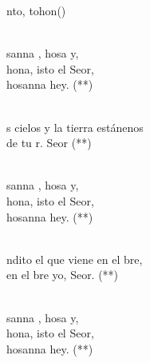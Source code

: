 \begin{cancion}[Santo][Zaireño]%
	nto, tohon()\\\jump\\
	\begin{chorus}%
	sanna , hosa y,\\
	hona, isto el Seor,\\
hosanna hey. (**)\\
	\end{chorus}%
	\jump\\
	s cielos y la tierra estánenos\\
	de tu r. Seor (**)\\\jump\\
	\begin{chorus}%
	sanna , hosa y,\\
	hona, isto el Seor,\\
hosanna hey. (**)\\
	\end{chorus}%
	\jump\\
	ndito el que viene en el bre,\\
	en el bre yo, Seor. (**)\\\jump\\
	\begin{chorus}%
	sanna , hosa y,\\
	hona, isto el Seor,\\
hosanna hey. (**)\\
	\end{chorus}%
	\jump\\
\end{cancion}%
